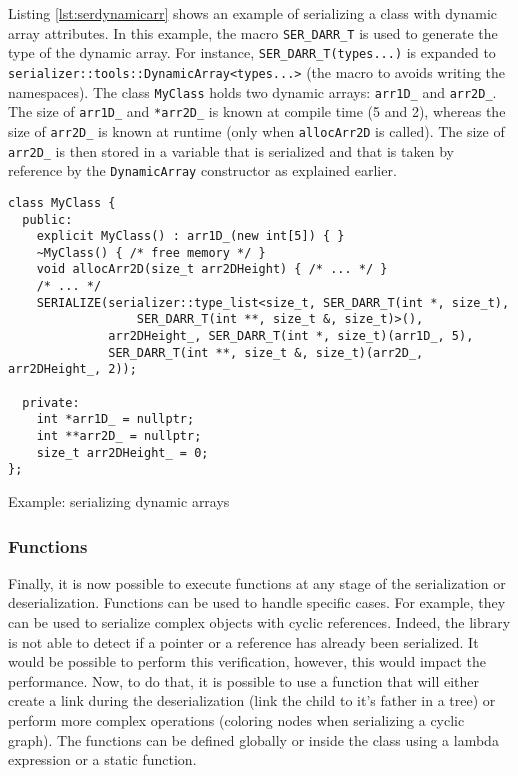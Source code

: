 Listing \ref{lst:serdynamicarr} shows an example of serializing a class with
dynamic array attributes. In this example, the macro \texttt{SER\_DARR\_T} is
used to generate the type of the dynamic array. For instance,
\texttt{SER\_DARR\_T(types...)} is expanded to
\texttt{serializer::tools::DynamicArray<types...>} (the macro to avoids writing
the namespaces). The class \texttt{MyClass} holds two dynamic arrays:
\texttt{arr1D\_} and \texttt{arr2D\_}. The size of \texttt{arr1D\_} and
\texttt{*arr2D\_} is known at compile time (5 and 2), whereas the size of
\texttt{arr2D\_} is known at runtime (only when \texttt{allocArr2D} is called).
The size of \texttt{arr2D\_} is then stored in a variable that is serialized and
that is taken by reference by the \texttt{DynamicArray} constructor as explained
earlier.

\begin{listing}[ht!]
\begin{verbatim}
class MyClass {
  public:
    explicit MyClass() : arr1D_(new int[5]) { }
    ~MyClass() { /* free memory */ }
    void allocArr2D(size_t arr2DHeight) { /* ... */ }
    /* ... */
    SERIALIZE(serializer::type_list<size_t, SER_DARR_T(int *, size_t),
                  SER_DARR_T(int **, size_t &, size_t)>(),
              arr2DHeight_, SER_DARR_T(int *, size_t)(arr1D_, 5),
              SER_DARR_T(int **, size_t &, size_t)(arr2D_, arr2DHeight_, 2));

  private:
    int *arr1D_ = nullptr;
    int **arr2D_ = nullptr;
    size_t arr2DHeight_ = 0;
};
\end{verbatim}
\caption{Example: serializing dynamic arrays}
\label{lst:serdynamicarr}
\end{listing}

\subsubsection{Functions}

Finally, it is now possible to execute functions at any stage of the
serialization or deserialization. Functions can be used to handle specific
cases. For example, they can be used to serialize complex objects with cyclic
references. Indeed, the library is not able to detect if a pointer or a
reference has already been serialized. It would be possible to perform this
verification, however, this would impact the performance. Now, to do that, it
is possible to use a function that will either create a link during the
deserialization (link the child to it's father in a tree) or perform more
complex operations (coloring nodes when serializing a cyclic graph). The
functions can be defined globally or inside the class using a lambda expression
or a static function.

